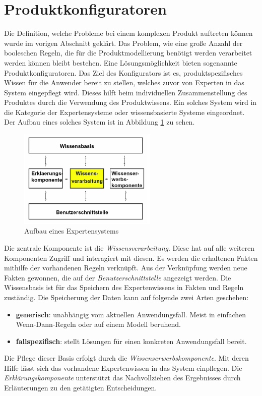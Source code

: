 \section{Produktkonfiguratoren}\label{konfiguratoren}
Die Definition, welche Probleme bei einem komplexen Produkt auftreten können wurde im vorigen Abschnitt geklärt. Das Problem, wie eine große Anzahl der booleschen Regeln, die für die Produktmodellierung benötigt werden verarbeitet werden können bleibt bestehen. Eine Lösungsmöglichkeit bieten sogenannte Produktkonfiguratoren.
Das Ziel des Konfigurators ist es, produktspezifisches Wissen für die Anwender bereit zu stellen, welches zuvor von Experten in das System eingepflegt wird. Dieses hilft beim individuellen Zusammenstellung des Produktes durch die Verwendung des Produktwissens. Ein solches System wird in die Kategorie der Expertensysteme\cite{bib:puppe} oder wissensbasierte Systeme eingeordnet. Der Aufbau eines solches System ist in Abbildung \ref{expert_system_structure} zu sehen. \par
\begin{figure}
\centering
\includegraphics[width=250px]{images/expertensysteme}
\caption{Aufbau eines Expertensystems \cite[s.6]{bib:keller}}
\label{expert_system_structure}
\end{figure}

Die zentrale Komponente ist die \textit{Wissensverarbeitung}. Diese hat auf alle weiteren Komponenten Zugriff und interagiert mit diesen. Es werden die erhaltenen Fakten mithilfe der vorhandenen Regeln verknüpft. Aus der Verknüpfung werden neue Fakten gewonnen, die auf der \textit{Benutzerschnittstelle} angezeigt werden. Die Wissensbasis ist für das Speichern des Expertenwissens in Fakten und Regeln zuständig. Die Speicherung der Daten kann auf folgende zwei Arten geschehen\cite{bib:expert1}:\par
\begin{itemize}
        \item \textbf{generisch}: unabhängig vom aktuellen Anwendungsfall. Meist in einfachen Wenn-Dann-Regeln oder auf einem Modell beruhend. 
        \item \textbf{fallspezifisch}: stellt Lösungen für einen konkreten Anwendungsfall bereit.
\end{itemize}
 Die Pflege dieser Basis erfolgt durch die \textit{Wissenserwerbskomponente}. Mit deren Hilfe lässt sich das vorhandene Expertenwissen in das System einpflegen. Die \textit{Erklärungskomponente} unterstützt das Nachvollziehen des Ergebnisses durch Erläuterungen zu den getätigten Entscheidungen.

